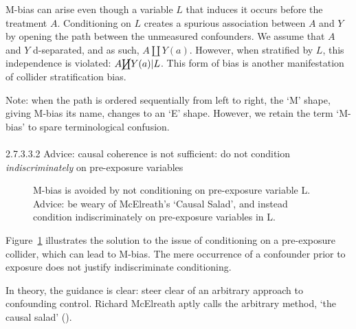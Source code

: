 \documentclass[
  singlecolumn]{article}
\makeatletter
\let\oldparagraph\paragraph
\renewcommand{\paragraph}{
    \@ifstar
      \xxxParagraphStar
      \xxxParagraphNoStar
  }
\newcommand{\xxxParagraphStar}[1]{\oldparagraph*{#1}\mbox{}}
\newcommand{\xxxParagraphNoStar}[1]{\oldparagraph{#1}\mbox{}}
\makeatother
\begin{document}
M-bias can arise even though a variable \(L\) that induces it occurs
before the treatment \(A\). Conditioning on \(L\) creates a spurious
association between \(A\) and \(Y\) by opening the path between the
unmeasured confounders. We assume that \(A\) and \(Y\) d-separated, and
as such, \(A \coprod Y(a)\). However, when stratified by \(L\), this
independence is violated: \(A \cancel{\coprod} Y(a)| L\). This form of
bias is another manifestation of collider stratification bias.

Note: when the path is ordered sequentially from left to right, the `M'
shape, giving M-bias its name, changes to an `E' shape. However, we
retain the term `M-bias' to spare terminological confusion.

\paragraph{\texorpdfstring{2.7.3.3.2 Advice: causal coherence is not
sufficient: do not condition \emph{indiscriminately} on pre-exposure
variables}{2.7.3.3.2 Advice: causal coherence is not sufficient: do not condition indiscriminately on pre-exposure variables}}\label{advice-causal-coherence-is-not-sufficient-do-not-condition-indiscriminately-on-pre-exposure-variables}

\begin{figure}


\caption{\label{fig-m-bias-solution}M-bias is avoided by not
conditioning on pre-exposure variable L. Advice: be weary of McElreath's
`Causal Salad', and instead condition indiscriminately on pre-exposure
variables in L.}

\end{figure}%

Figure~\ref{fig-m-bias-solution} illustrates the solution to the issue
of conditioning on a pre-exposure collider, which can lead to M-bias.
The mere occurrence of a confounder prior to exposure does not justify
indiscriminate conditioning.

In theory, the guidance is clear: steer clear of an arbitrary approach
to confounding control. Richard McElreath aptly calls the arbitrary
method, `the causal salad' ().
\end{document}
